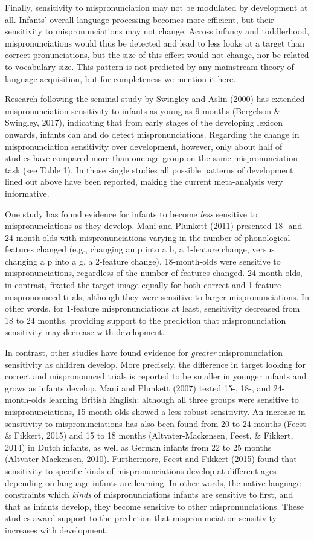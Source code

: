 \documentclass[man]{apa6}
\theoremstyle{definition}
\theoremstyle{definition}
\theoremstyle{definition}
\theoremstyle{remark}
\begin{document}
Finally, sensitivity to mispronunciation may not be modulated by
development at all. Infants' overall language processing becomes more
efficient, but their sensitivity to mispronunciations may not change.
Across infancy and toddlerhood, mispronunciations would thus be detected
and lead to less looks at a target than correct pronunciations, but the
size of this effect would not change, nor be related to vocabulary size.
This pattern is not predicted by any mainstream theory of language
acquisition, but for completeness we mention it here.

Research following the seminal study by Swingley and Aslin (2000) has
extended mispronunciation sensitivity to infants as young as 9 months
(Bergelson \& Swingley, 2017), indicating that from early stages of the
developing lexicon onwards, infants can and do detect mispronunciations.
Regarding the change in mispronunciation sensitivity over development,
however, only about half of studies have compared more than one age
group on the same mispronunciation task (see Table 1). In those single
studies all possible patterns of development lined out above have been
reported, making the current meta-analysis very informative.

One study has found evidence for infants to become \emph{less} sensitive
to mispronunciations as they develop. Mani and Plunkett (2011) presented
18- and 24-month-olds with mispronunciations varying in the number of
phonological features changed (e.g., changing an p into a b, a 1-feature
change, versus changing a p into a g, a 2-feature change). 18-month-olds
were sensitive to mispronunciations, regardless of the number of
features changed. 24-month-olds, in contrast, fixated the target image
equally for both correct and 1-feature mispronounced trials, although
they were sensitive to larger mispronunciations. In other words, for
1-feature mispronunciations at least, sensitivity decreased from 18 to
24 months, providing support to the prediction that mispronunciation
sensitivity may decrease with development.

In contrast, other studies have found evidence for \emph{greater}
mispronunciation sensitivity as children develop. More precisely, the
difference in target looking for correct and mispronounced trials is
reported to be smaller in younger infants and grows as infants develop.
Mani and Plunkett (2007) tested 15-, 18-, and 24-month-olds learning
British English; although all three groups were sensitive to
mispronunciations, 15-month-olds showed a less robust sensitivity. An
increase in sensitivity to mispronunciations has also been found from 20
to 24 months (Feest \& Fikkert, 2015) and 15 to 18 months
(Altvater-Mackensen, Feest, \& Fikkert, 2014) in Dutch infants, as well
as German infants from 22 to 25 months (Altvater-Mackensen, 2010).
Furthermore, Feest and Fikkert (2015) found that sensitivity to specific
kinds of mispronunciations develop at different ages depending on
language infants are learning. In other words, the native language
constraints which \emph{kinds} of mispronunciations infants are
sensitive to first, and that as infants develop, they become sensitive
to other mispronunciations. These studies award support to the
prediction that mispronunciation sensitivity increases with development.
\end{document}
